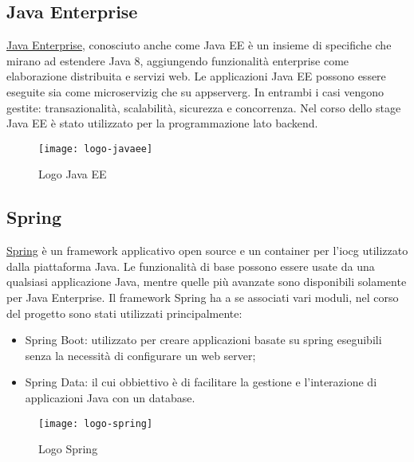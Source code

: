 \subsection{Java Enterprise}
\href{https://www.oracle.com/it/java/technologies/java-ee-glance.html}{Java Enterprise}, conosciuto anche come Java EE è un insieme di specifiche che mirano ad estendere Java 8, aggiungendo funzionalità enterprise come elaborazione distribuita e servizi web. Le applicazioni Java EE possono essere eseguite sia come \gls{microservizig}\glsfirstoccur{} che su \gls{appserverg}\glsfirstoccur{}. In entrambi i casi vengono gestite: transazionalità, scalabilità, sicurezza e concorrenza.
Nel corso dello stage Java EE è stato utilizzato per la programmazione lato backend.
\begin{figure}[h]
    \begin{center}
    \texttt{[image: logo-javaee]}
    \caption{Logo Java EE}
    \label{fig:figure3}
    \end{center}
\end{figure}

\subsection{Spring}
\href{https://spring.io/}{Spring} è un framework applicativo open source e un container per l'\gls{iocg}\glsfirstoccur{} utilizzato dalla piattaforma Java. Le funzionalità di base possono essere usate da una qualsiasi applicazione Java, mentre quelle più avanzate sono disponibili solamente per Java Enterprise.
Il framework Spring ha a se associati vari moduli, nel corso del progetto sono stati utilizzati principalmente:
\begin{itemize}
    \item Spring Boot: utilizzato per creare applicazioni basate su spring eseguibili senza la necessità di configurare un web server;
    \item Spring Data: il cui obbiettivo è di facilitare la gestione e l'interazione di applicazioni Java con un database.
\end{itemize}
\begin{figure}[h]
    \begin{center}
    \texttt{[image: logo-spring]}
    \caption{Logo Spring}
    \label{fig:figure4}
    \end{center}
\end{figure}

